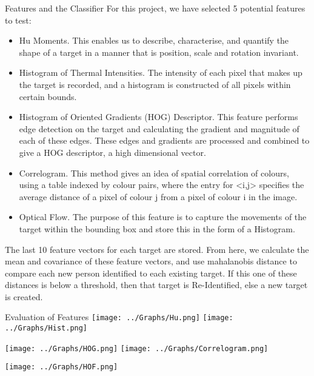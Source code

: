 \documentclass[final]{beamer}
\begin{document}
\begin{frame}{}
\begin{columns}[t]
      \begin{column}{.48\linewidth}
        \begin{block}{Features and the Classifier}
        For this project, we have selected 5 potential features to test:
          \begin{itemize}
          \item Hu Moments. 
          This enables us to describe, characterise, and quantify the shape of a target in a manner that is position, scale and rotation invariant.
          \item Histogram of Thermal Intensities. The intensity of each pixel that makes up the target is recorded, and a histogram is constructed of all pixels within certain bounds.
          \item Histogram of Oriented Gradients (HOG) Descriptor. This feature performs edge detection on the target and calculating the gradient and magnitude of each of these edges. These edges and gradients are processed and combined to give a HOG descriptor, a high dimensional vector. 
          \item Correlogram. This method gives an idea of spatial correlation of colours, using a table indexed by colour pairs, where the  entry for <i,j>
  specifies the average distance of a pixel of colour j from a pixel of colour i
  in the image.
          \item Optical Flow. The purpose of this feature is to capture the movements of the target within the bounding box and store this in the form of a Histogram.
          \end{itemize}
          The last 10 feature vectors for each target are stored. From here, we calculate the mean and covariance of these feature vectors, and use mahalanobis distance to compare each new person identified to each existing target. If this one of these distances is below a threshold, then that target is Re-Identified, else a new target is created.  
        \end{block}

        \begin{block}{Evaluation of Features}
		\texttt{[image: ../Graphs/Hu.png]}
		\texttt{[image: ../Graphs/Hist.png]}
		
		\texttt{[image: ../Graphs/HOG.png]}
		\texttt{[image: ../Graphs/Correlogram.png]}
		
		\texttt{[image: ../Graphs/HOF.png]}
		

\end{block}
\end{column}
\end{columns}
\end{frame}
\end{document}
